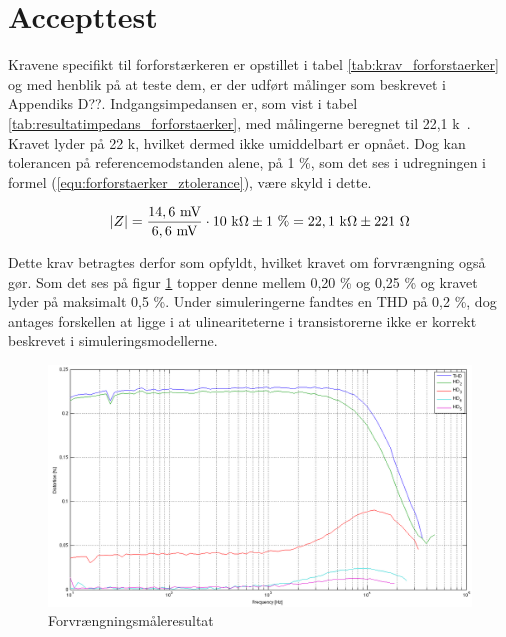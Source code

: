 \section{Accepttest}
\label{forforstaerker_accepttest}

Kravene specifikt til forforstærkeren er opstillet i tabel \ref{tab:krav_forforstaerker} og med henblik på at teste dem, er der udført målinger som beskrevet i Appendiks D??. Indgangsimpedansen er, som vist i tabel \ref{tab:resultatimpedans_forforstaerker}, med målingerne beregnet til 22,1 k\ohm~. Kravet lyder på 22 k\ohm, hvilket dermed ikke umiddelbart er opnået. Dog kan tolerancen på referencemodstanden alene, på 1 \%, som det ses i udregningen i formel (\ref{equ:forforstaerker_ztolerance}), være skyld i dette.

\begin{equation}
\label{equ:forforstaerker_ztolerance}
\vert Z \vert = \frac{\mathrm{14,6~mV}}{\mathrm{6,6~mV}} \cdot \mathrm{10~k\ohm} \pm 1~\% =  \mathrm{22,1~k\ohm} \pm 221~\ohm
\end{equation}

Dette krav betragtes derfor som opfyldt, hvilket kravet om forvrængning også gør. Som det ses på figur \ref{fig:accepttest-thdresultat-forforstaerker} topper denne mellem 0,20 \% og 0,25 \% og kravet lyder på maksimalt 0,5 \%. Under simuleringerne fandtes en THD på 0,2 \%, dog antages forskellen at ligge i at ulineariteterne i transistorerne ikke er korrekt beskrevet i simuleringsmodellerne. 

\begin{figure}[h]
\centering
\includegraphics[scale=0.3]{maalerapporter/forforstaerker/thd-forforstaerker.png}
\caption{Forvrængningsmåleresultat}
\label{fig:accepttest-thdresultat-forforstaerker}
\end{figure}

